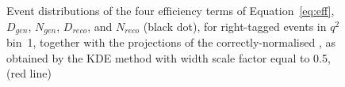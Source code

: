 \begin{figure}[hbt]
    \caption{Event distributions of the four efficiency terms of Equation~\ref{eq:eff}, $D_{gen}$, $N_{gen}$, $D_{reco}$, and $N_{reco}$ (black dot), for right-tagged events in $q^2$ bin~1, together with the projections of the correctly-normalised \pdfs, as obtained by the KDE method with width scale factor equal to 0.5, (red line)}
    \label{fig:NDKde1}
\end{figure}








